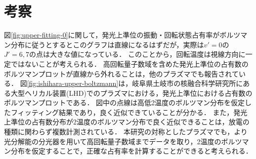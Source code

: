\chapter{考察}
図\ref{fig:upper-fitting-0}に関して，発光上準位の振動・回転状態占有率がボルツマン分布に従うとするとこのグラフは直線になるはずだが，実際は$v'=0$の$J'=6,7$の点は大きな値になっている．
このことから，回転温度は視線方向に一定ではないことが考えられる．
高回転量子数域を含めた発光上準位の占有数のボルツマンプロットが直線から外れることは，他のプラズマでも報告されている．
図\ref{fig:ishihara-upper-boltzmann}は，岐阜県土岐市の核融合科学研究所にある大型ヘリカル装置(LHD)でのプラズマにおける，発光上準位における占有数のボルツマンプロットである\cite{ishihara}．
図中の点線は高低2温度のボルツマン分布を仮定したフィッティング結果であり，良く近似できていることが分かる．
また，発光上準位の占有数分布が2温度のボルツマン分布で良く近似できることは，放電の種類に関わらず複数計測されている\cite{ishihara, two-temperature-1, two-temperature-2}．
本研究の対称としたプラズマでも，より光分解能の分光器を用いて高回転量子数域までデータを取り，2温度のボルツマン分布を仮定することで，正確な占有率を計算することができると考えられる．